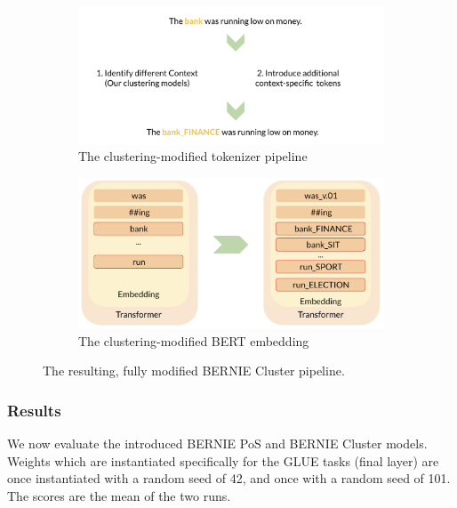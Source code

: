 \documentclass[a4paper,12pt,oneside,openright]{report}
\begin{document}
\begin{figure}
\center
\begin{subfigure}{.54\textwidth}
  \centering
  \includegraphics[width=\linewidth]{./assets/experiments/pipeline_tokenizer_BERnie_meaning.png}
  \caption{The clustering-modified tokenizer pipeline}
  \label{fig:sfig1}
\end{subfigure}%
\begin{subfigure}{.5\textwidth}
  \centering
  \includegraphics[width=\linewidth]{./assets/experiments/pipeline_model_BERnie_meaning_embedding.png}
  \caption{The clustering-modified BERT embedding}
  \label{fig:sfig2}
\end{subfigure}
\caption{The resulting, fully modified BERNIE Cluster pipeline.}
\label{fig:fig}
\end{figure}


\subsubsection{Results}

We now evaluate the introduced BERNIE PoS and BERNIE Cluster models.
Weights which are instantiated specifically for the GLUE tasks (final layer) are once instantiated with a random seed of 42, and once with a random seed of 101.
The scores are the mean of the two runs.
\end{document}
